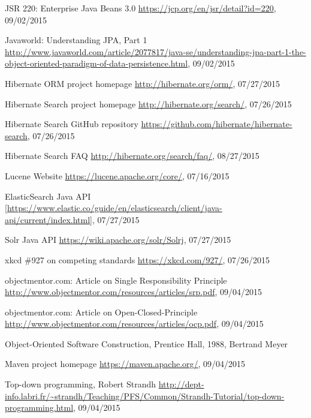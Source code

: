 %
%
\begin{thebibliography}{100}
	
	 JSR 220: Enterprise Java Beans 3.0
	\url{https://jcp.org/en/jsr/detail?id=220}, 09/02/2015
	
	 Javaworld: Understanding JPA, Part 1
	\url{http://www.javaworld.com/article/2077817/java-se/understanding-jpa-part-1-the-object-oriented-paradigm-of-data-persistence.html}, 09/02/2015
	
	 Hibernate ORM project homepage
	\url{http://hibernate.org/orm/}, 07/27/2015
	
	 Hibernate Search project homepage
	\url{http://hibernate.org/search/}, 07/26/2015
	
	 Hibernate Search GitHub repository
	\url{https://github.com/hibernate/hibernate-search}, 07/26/2015
	
	 Hibernate Search FAQ
	\url{http://hibernate.org/search/faq/}, 08/27/2015
	
	 Lucene Website
	\url{https://lucene.apache.org/core/}, 07/16/2015
	
	 ElasticSearch Java API
	\url{[https://www.elastic.co/guide/en/elasticsearch/client/java-api/current/index.html]}, 07/27/2015
	
	 Solr Java API
	\url{https://wiki.apache.org/solr/Solrj}, 07/27/2015
	
	 xkcd \#927 on competing standards
	\url{https://xkcd.com/927/}, 07/26/2015
	
	 objectmentor.com: Article on Single Responsibility Principle
	\url{http://www.objectmentor.com/resources/articles/srp.pdf}, 09/04/2015
	
	 objectmentor.com: Article on Open-Closed-Principle
	\url{http://www.objectmentor.com/resources/articles/ocp.pdf}, 09/04/2015
	
	 Object-Oriented Software Construction, Prentice Hall, 1988, Bertrand Meyer
	
	 Maven project homepage
	\url{https://maven.apache.org/}, 09/04/2015
	
	 Top-down programming, Robert Strandh
	\url{http://dept-info.labri.fr/~strandh/Teaching/PFS/Common/Strandh-Tutorial/top-down-programming.html},
	09/04/2015
	

\end{thebibliography}
